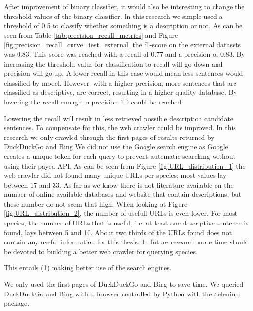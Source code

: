 \documentclass[a4paper, 12pt, oneside]{book} %
\begin{document}
After improvement of binary classifier, it would also be interesting to change the threshold values of the binary classifier.
In this research we simple used a threshold of 0.5 to classify whether something is a description or not.
As can be seen from Table \ref{tab:precision_recall_metrics} and Figure \ref{fig:precision_recall_curve_test_external} the f1-score on the external datasets was 0.83. 
This score was reached with a recall of 0.77 and a precision of 0.83.
By increasing the threshold value for classification to recall will go down and precision will go up.
A lower recall in this case would mean less sentences would classified by model.
However, with a higher precision, more sentences that are classified as descriptive, are correct, resulting in a higher quality database.
By lowering the recall enough, a precision 1.0 could be reached.

Lowering the recall will result in less retrieved possible description candidate sentences.
To compensate for this, the web crawler could be improved.
In this research we only crawled through the first pages of results returned by DuckDuckGo and Bing
We did not use the Google search engine as Google creates a unique token for each query to prevent automatic searching without using their payed API.
As can be seen from Figure \ref{fig:URL_distribution_1} the web crawler did not found many unique URLs per species; most values lay between 17 and 33.
As far as we know there is not literature available on the number of online available databases and website that contain descriptions, but these number do not seem that high.
When looking at Figure \ref{fig:URL_distribution_2}, the number of usefull URLs is even lower.
For most species, the number of URLs that is useful, i.e. at least one descriptive sentence is found, lays between 5 and 10.
About two thirds of the URLs found does not contain any useful information for this thesis.
In future research more time should be devoted to building a better web crawler for querying species.

This entails (1) making better use of the search engines.


We only used the first pages of DuckDuckGo and Bing to save time.
We queried DuckDuckGo and Bing with a browser controlled by Python with the Selenium package.
\end{document}
